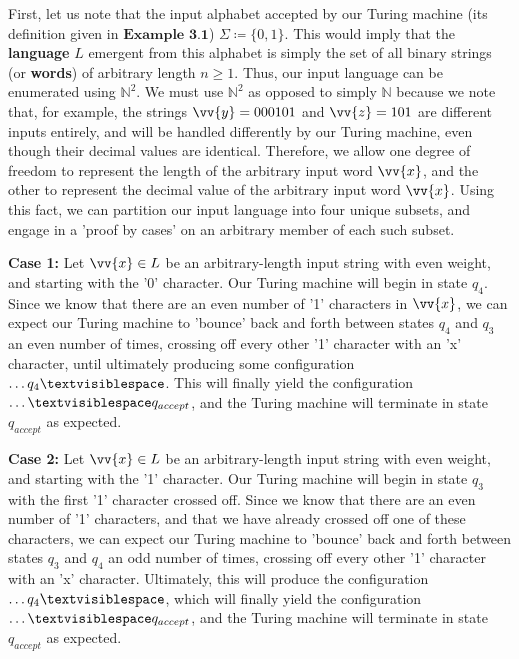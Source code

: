 \documentclass{article}
\begin{document}
\begin{prf}
	First, let us note that the input alphabet accepted by our Turing machine (its definition given in $\textbf{Example 3.1}$) $\Sigma \coloneq \{ 0, 1 \}$.  This would imply that the \textbf{language} $L$ emergent from this alphabet is simply the set of all binary strings (or \textbf{words}) of arbitrary length $n \geq 1$.  Thus, our input language can be enumerated using $\mathbb{N}^{2}$.  We must use $\mathbb{N}^{2}$ as opposed to simply $\mathbb{N}$ because we note that, for example, the strings $\vv{y}=000101$ and $\vv{z}=101$ are different inputs entirely, and will be handled differently by our Turing machine, even though their decimal values are identical.  Therefore, we allow one degree of freedom to represent the length of the arbitrary input word $\vv{x}$, and the other to represent the decimal value of the arbitrary input word $\vv{x}$.  Using this fact, we can partition our input language into four unique subsets, and engage in a 'proof by cases' on an arbitrary member of each such subset.\\
\begin{adjustwidth}{0.5cm}{}
	\textbf{Case 1:} Let $\vv{x} \in L$ be an arbitrary-length input string with even weight, and starting with the '0' character.  Our Turing machine will begin in state $q_{4}$.  Since we know that there are an even number of '1' characters in $\vv{x}$, we can expect our Turing machine to 'bounce' back and forth between states $q_{4}$ and $q_{3}$ an even number of times, crossing off every other '1' character with an 'x' character, until ultimately producing some configuration $\dots q_{4}\textvisiblespace$.  This will finally yield the configuration $\dots \textvisiblespace q_{accept}$, and the Turing machine will terminate in state $q_{accept}$ as expected.\\
\end{adjustwidth}
\begin{adjustwidth}{0.5cm}{}
	\textbf{Case 2:} Let $\vv{x} \in L$ be an arbitrary-length input string with even weight, and starting with the '1' character.  Our Turing machine will begin in state $q_{3}$ with the first '1' character crossed off.  Since we know that there are an even number of '1' characters, and that we have already crossed off one of these characters, we can expect our Turing machine to 'bounce' back and forth between states $q_{3}$ and $q_{4}$ an odd number of times, crossing off every other '1' character with an 'x' character.  Ultimately, this will produce the configuration $\dots q_{4}\textvisiblespace$, which will finally yield the configuration $\dots \textvisiblespace q_{accept}$, and the Turing machine will terminate in state $q_{accept}$ as expected.\\

\end{adjustwidth}
\end{prf}
\end{document}
